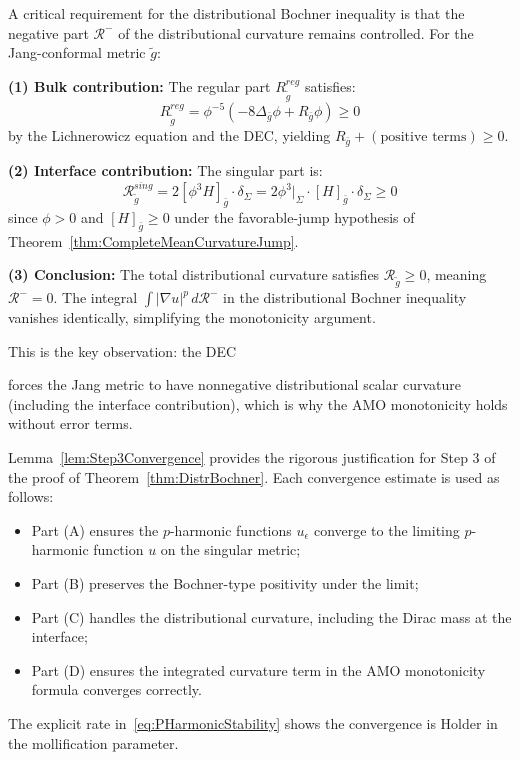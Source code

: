 \begin{remark}\label{rem:CurvatureMeasureControl}
A critical requirement for the distributional Bochner inequality is that the negative part $\mathcal{R}^-$ of the distributional curvature remains controlled. For the Jang-conformal metric $\tilde{g}$:

\textbf{(1) Bulk contribution:} The regular part $R_{\tilde{g}}^{reg}$ satisfies:
\begin{equation}
    R_{\tilde{g}}^{reg} = \phi^{-5}(-8\Delta_{\bar{g}}\phi + R_{\bar{g}}\phi) \ge 0
\end{equation}
by the Lichnerowicz equation and the DEC, yielding $R_{\bar{g}} + (\text{positive terms}) \ge 0$.

\textbf{(2) Interface contribution:} The singular part is:
\begin{equation}
    \mathcal{R}_{\tilde{g}}^{sing} = 2[\phi^3 H]_{\bar{g}} \cdot \delta_\Sigma = 2\phi^3|_\Sigma \cdot [H]_{\bar{g}} \cdot \delta_\Sigma \ge 0
\end{equation}
since $\phi > 0$ and $[H]_{\bar{g}} \ge 0$ under the favorable-jump hypothesis of Theorem~\ref{thm:CompleteMeanCurvatureJump}.

\textbf{(3) Conclusion:} The total distributional curvature satisfies $\mathcal{R}_{\tilde{g}} \ge 0$, meaning $\mathcal{R}^- = 0$. The integral $\int |\nabla u|^p \, d\mathcal{R}^-$ in the distributional Bochner inequality vanishes identically, simplifying the monotonicity argument.

This is the key observation: the DEC

 forces the Jang metric to have nonnegative distributional scalar curvature (including the interface contribution), which is why the AMO monotonicity holds without error terms.
\end{remark}

\begin{remark}
Lemma~\ref{lem:Step3Convergence} provides the rigorous justification for Step 3 of the proof of Theorem~\ref{thm:DistrBochner}. Each convergence estimate is used as follows:
\begin{itemize}
    \item Part (A) ensures the $p$-harmonic functions $u_\epsilon$ converge to the limiting $p$-harmonic function $u$ on the singular metric;
    \item Part (B) preserves the Bochner-type positivity under the limit;
    \item Part (C) handles the distributional curvature, including the Dirac mass at the interface;
    \item Part (D) ensures the integrated curvature term in the AMO monotonicity formula converges correctly.
\end{itemize}
The explicit rate in~\eqref{eq:PHarmonicStability} shows the convergence is Holder in the mollification parameter.
\end{remark}

